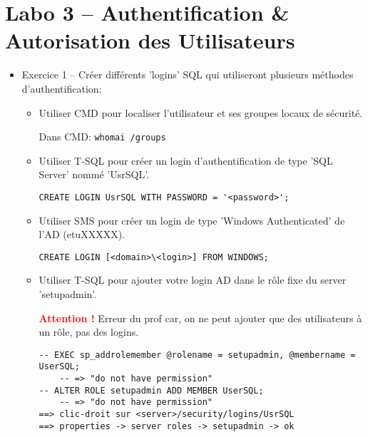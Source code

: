 \documentclass[a4paper]{article}
\begin{document}
\appendix \newpage




















\section{Labo 3 -- Authentification \& Autorisation des Utilisateurs}





\begin{itemize}



\item Exercice 1 -- Créer différents 'logins' SQL qui utiliseront plusieurs méthodes d’authentification:
\begin{itemize}

\item Utiliser CMD pour localiser l'utilisateur et ses groupes locaux de sécurité.
\begin{example}
Dans CMD: \texttt{whomai /groups}
\end{example}

\item Utiliser T-SQL pour créer un login d’authentification de type 'SQL Server' nommé 'UsrSQL'.
\begin{example} \begin{verbatim}
CREATE LOGIN UsrSQL WITH PASSWORD = '<password>';
\end{verbatim} \end{example}

\item Utiliser SMS pour créer un login de type 'Windows Authenticated' de l'AD (etuXXXXX).
\begin{example} \begin{verbatim}
CREATE LOGIN [<domain>\<login>] FROM WINDOWS;
\end{verbatim} \end{example}

\item Utiliser T-SQL pour ajouter votre login AD dans le rôle fixe du server 'setupadmin'.
\begin{example}
    \textcolor{red}{\textbf{Attention !}} Erreur du prof car, on ne peut ajouter que des utilisateurs à un rôle, pas des logins.    
\end{example}
\begin{example} \begin{verbatim}
-- EXEC sp_addrolemember @rolename = setupadmin, @membername = UserSQL;
    -- => "do not have permission"
-- ALTER ROLE setupadmin ADD MEMBER UserSQL;
    -- => "do not have permission"
==> clic-droit sur <server>/security/logins/UsrSQL
==> properties -> server roles -> setupadmin -> ok
\end{verbatim} \end{example}


\end{itemize}
\end{itemize}
\end{document}
